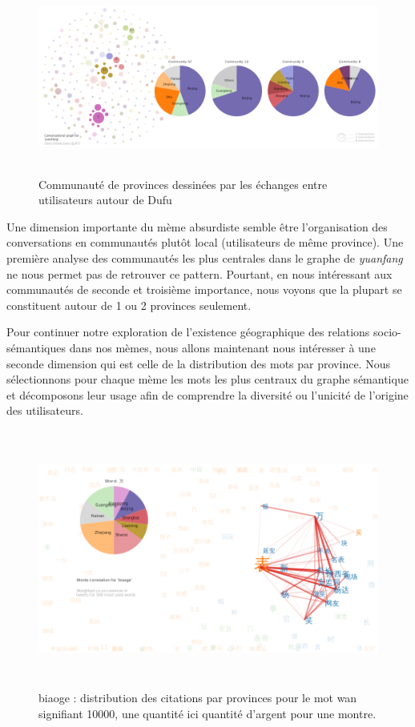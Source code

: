 \begin{figure}
    \centering
    \includegraphics[width=5.9996in,height=2.5004in]{figures/chap4/chapitre4-img58.png}
    \caption{
        Communauté de provinces dessinées par les échanges entre utilisateurs autour de Dufu
    }
    \label{fig:dufu-users-pie}
\end{figure}


Une dimension importante du mème absurdiste semble être l{\textquoteright}organisation des conversations en communautés plut\^ot local (utilisateurs de même province). Une première analyse des communautés les plus centrales dans le graphe de \textit{yuanfang} ne nous permet pas de retrouver ce pattern. Pourtant, en nous intéressant aux communautés de seconde et troisième importance, nous voyons que la plupart se constituent autour de 1 ou 2 provinces seulement.  

Pour continuer notre exploration de l{\textquoteright}existence géographique des relations socio-sémantiques dans nos mèmes, nous allons maintenant nous intéresser \`a une seconde dimension qui est celle de la distribution des mots par province. Nous sélectionnons pour chaque mème les mots les plus centraux du graphe sémantique et décomposons leur usage afin de comprendre la diversité ou l{\textquoteright}unicité de l{\textquoteright}origine des utilisateurs. 

\begin{figure}[h!]
    \centering
    \includegraphics[width=6.0087in,height=3.3386in]{figures/chap4/chapitre4-img59.png}
    \caption{
      biaoge : distribution des citations par provinces pour le mot wan signifiant 10000, une quantité ici quantité d{\textquoteright}argent pour une montre.
    }
    \label{fig:biaoge-words-pie-wan}
\end{figure}
 
